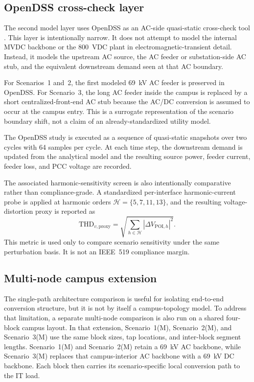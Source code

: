 \documentclass[11pt]{article}
\begin{document}
\subsection{OpenDSS cross-check layer}
The second model layer uses OpenDSS as an AC-side quasi-static cross-check tool \cite{OpenDSS2026}. This layer is intentionally narrow. It does not attempt to model the internal MVDC backbone or the 800~VDC plant in electromagnetic-transient detail. Instead, it models the upstream AC source, the AC feeder or substation-side AC stub, and the equivalent downstream demand seen at that AC boundary.

For Scenarios~1 and~2, the first modeled 69~kV AC feeder is preserved in OpenDSS. For Scenario~3, the long AC feeder inside the campus is replaced by a short centralized-front-end AC stub because the AC/DC conversion is assumed to occur at the campus entry. This is a surrogate representation of the scenario boundary shift, not a claim of an already-standardized utility model.

The OpenDSS study is executed as a sequence of quasi-static snapshots over two cycles with 64 samples per cycle. At each time step, the downstream demand is updated from the analytical model and the resulting source power, feeder current, feeder loss, and PCC voltage are recorded.

The associated harmonic-sensitivity screen is also intentionally comparative rather than compliance-grade. A standardized per-interface harmonic-current probe is applied at harmonic orders $\mathcal{H}=\{5,7,11,13\}$, and the resulting voltage-distortion proxy is reported as
\begin{equation}
\text{THD}_{v,\text{proxy}} = \sqrt{\sum_{h \in \mathcal{H}} \left|\Delta V_{\text{POI},h}\right|^2 }.
\end{equation}
This metric is used only to compare scenario sensitivity under the same perturbation basis. It is not an IEEE~519 compliance margin.

\subsection{Multi-node campus extension}
The single-path architecture comparison is useful for isolating end-to-end conversion structure, but it is not by itself a campus-topology model. To address that limitation, a separate multi-node comparison is also run on a shared four-block campus layout. In that extension, Scenario~1(M), Scenario~2(M), and Scenario~3(M) use the same block sizes, tap locations, and inter-block segment lengths. Scenario~1(M) and Scenario~2(M) retain a 69~kV AC backbone, while Scenario~3(M) replaces that campus-interior AC backbone with a 69~kV DC backbone. Each block then carries its scenario-specific local conversion path to the IT load.
\end{document}
